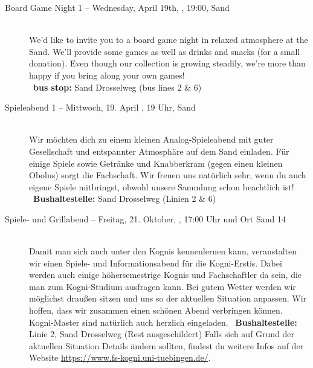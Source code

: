\begin{description}
\ifml
	\item[Board Game Night 1 -- Wednesday, April 19th, \YEAR, 19:00, Sand]~\\
	We'd like to invite you to a board game night in relaxed atmosphere at the Sand.
    We'll provide some games as well as drinks and snacks (for a small donation).
    Even though our collection is growing steadily, we're more than happy if you bring along your own games!\\
	~\textbf{bus stop:} Sand Drosselweg (bus lines 2 \& 6)
\else
    \item[Spieleabend 1 -- Mittwoch, 19. April \YEAR, 19 Uhr, Sand]~\\
	Wir möchten dich zu einem kleinen Analog-Spieleabend mit guter Gesellschaft und entspannter Atmosphäre auf dem Sand einladen.
    Für einige Spiele sowie Getränke und Knabberkram (gegen einen kleinen Obolus) sorgt die Fachschaft.
    Wir freuen uns natürlich sehr, wenn du auch eigene Spiele mitbringst, obwohl unsere Sammlung schon beachtlich ist!\\
	~\textbf{Bushaltestelle:} Sand Drosselweg (Linien 2 \& 6)
\fi

\ifkogwiss
    \item[Spiele- und Grillabend -- Freitag, 21. Oktober, \YEAR, 17:00 Uhr und Ort Sand 14]\ \\
	Damit man sich auch unter den Kognis kennenlernen kann, veranstalten wir einen Spiele- und Informationsabend für die Kogni-Erstis. Dabei werden auch einige höhersemestrige Kognis und Fachschaftler da sein, die man zum Kogni-Studium ausfragen kann. Bei gutem Wetter werden wir möglichst draußen sitzen und uns so der aktuellen Situation anpassen. Wir hoffen, dass wir zusammen einen schönen Abend verbringen können. Kogni-Master sind natürlich auch herzlich eingeladen.
	~\textbf{Bushaltestelle:} Linie 2, Sand Drosselweg (Rest ausgeschildert)
	Falls sich auf Grund der aktuellen Situation Details ändern sollten, findest du weitere Infos auf der Website \url{https://www.fs-kogni.uni-tuebingen.de/}.
\fi



\end{description}
